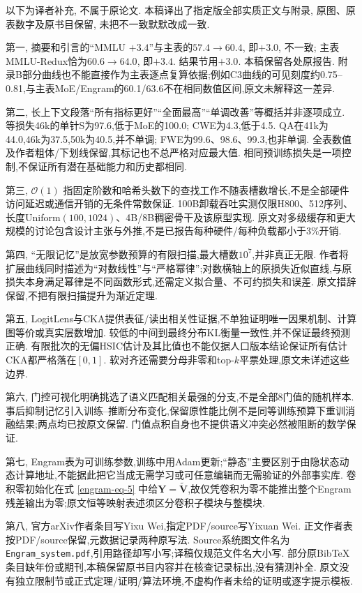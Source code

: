 \label{engram-translator-notes}
以下为译者补充, 不属于原论文. 本稿译出了指定版全部实质正文与附录, 原图、原表数字及原书目保留, 未把不一致默默改成一致.

第一, 摘要和引言的“MMLU $+3.4$”与主表的$57.4\to60.4$, 即$+3.0$, 不一致; 主表MMLU-Redux恰为$60.6\to64.0$, 即$+3.4$. 结果节用$+3.0$. 本稿保留各处原报告. 附录B部分曲线也不能直接作为主表逐点复算依据;例如C3曲线的可见刻度约0.75--0.81,与主表MoE/Engram的60.1/63.6不在相同数值区间,原文未解释这一差异.

第二, 长上下文段落“所有指标更好”“全面最高”“单调改善”等概括并非逐项成立. 等损失46k的单针S为97.6,低于MoE的100.0; CWE为4.3,低于4.5. QA在41k为44.0,46k为37.5,50k为40.5,并不单调; FWE为99.6、98.6、99.3,也非单调. 全表数值及作者粗体/下划线保留,其标记也不总严格对应最大值. 相同预训练损失是一项控制,不保证所有潜在基础能力和历史都相同.

第三, $\mathcal O(1)$ 指固定阶数和哈希头数下的查找工作不随表槽数增长,不是全部硬件访问延迟或通信开销的无条件常数保证. 100B卸载吞吐实测仅限H800、512序列、长度Uniform$(100,1024)$、4B/8B稠密骨干及该原型实现. 原文对多级缓存和更大规模的讨论包含设计主张与外推,不是已报告每种硬件/每种负载都小于3\%开销.

第四, “无限记忆”是放宽参数预算的有限扫描,最大槽数$10^7$,并非真正无限. 作者将扩展曲线同时描述为“对数线性”与“严格幂律”;对数横轴上的原损失近似直线,与原损失本身满足幂律是不同函数形式,还需定义拟合量、不可约损失和误差. 原文措辞保留,不把有限扫描提升为渐近定理.

第五, LogitLens与CKA提供表征/读出相关性证据,不单独证明唯一因果机制、计算图等价或真实层数增加. 较低的中间到最终分布KL衡量一致性,并不保证最终预测正确. 有限批次的无偏HSIC估计及其比值也不能仅据人口版本结论保证所有估计CKA都严格落在$[0,1]$. 软对齐还需要分母非零和top-$k$平票处理,原文未详述这些边界.

第六, 门控可视化明确挑选了语义匹配相关最强的分支,不是全部8门值的随机样本. 事后抑制记忆引入训练--推断分布变化,保留原性能比例不是同等训练预算下重训消融结果;两点均已按原文保留. 门值点积自身也不提供语义冲突必然被阻断的数学保证.

第七, Engram表为可训练参数,训练中用Adam更新;“静态”主要区别于由隐状态动态计算地址,不能据此把它当成无需学习或可任意编辑而无需验证的外部事实库. 卷积零初始化在式 \eqref{engram-eq-5} 中给$\mathbf Y=\tilde{\mathbf V}$,故仅凭卷积为零不能推出整个Engram残差输出为零;原文恒等映射表述须区分卷积子模块与整模块.

第八, 官方arXiv作者条目写Yixu Wei,指定PDF/source写Yixuan Wei. 正文作者表按PDF/source保留,元数据记录两种原写法. Source系统图文件名为\texttt{Engram\_system.pdf},引用路径却写小写;译稿仅规范文件名大小写. 部分原BibTeX条目缺年份或期刊,本稿保留原书目内容并在核查记录标出,没有猜测补全. 原文没有独立限制节或正式定理/证明/算法环境,不虚构作者未给的证明或逐字提示模板.


